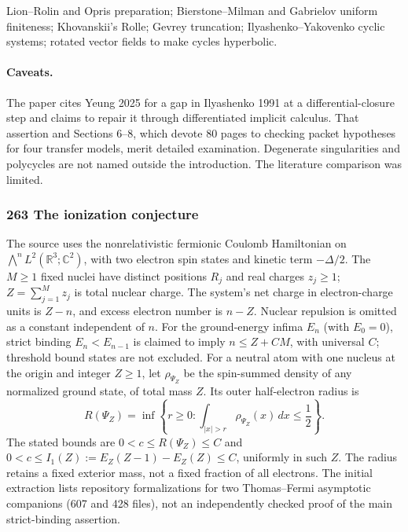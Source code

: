 \documentclass[11pt]{article}
\newcommand{\badges}[1]{\par\noindent{\small\sffamily\color{black!70}#1}\par\smallskip}
\newcommand{\badgesep}{\textbar}
\begin{document}
Lion--Rolin and Opris preparation; Bierstone--Milman and Gabrielov uniform finiteness; Khovanskii's Rolle; Gevrey truncation; Ilyashenko--Yakovenko cyclic systems; rotated vector fields to make cycles hyperbolic.

\paragraph{Caveats.}

The paper cites Yeung 2025 for a gap in Ilyashenko 1991 at a differential-closure step and claims to repair it through differentiated implicit calculus. That assertion and Sections 6--8, which devote 80 pages to checking packet hypotheses for four transfer models, merit detailed examination. Degenerate singularities and polycycles are not named outside the introduction. The literature comparison was limited.

\subsubsection{\texorpdfstring{263 \textperiodcentered{} The ionization conjecture}{263 · The ionization conjecture}}\label{fam:263}
\badges{headline not formalized; companions yes \badgesep{} new}

The source uses the nonrelativistic fermionic Coulomb Hamiltonian on $\bigwedge^n L^2(\mathbb R^3;\mathbb C^2)$, with two electron spin states and kinetic term $-\Delta/2$. The $M\ge1$ fixed nuclei have distinct positions $R_j$ and real charges $z_j\ge1$; $Z=\sum_{j=1}^M z_j$ is total nuclear charge. The system's net charge in electron-charge units is $Z-n$, and excess electron number is $n-Z$. Nuclear repulsion is omitted as a constant independent of $n$. For the ground-energy infima $E_n$ (with $E_0=0$), strict binding $E_n<E_{n-1}$ is claimed to imply $n\le Z+CM$, with universal $C$; threshold bound states are not excluded. For a neutral atom with one nucleus at the origin and integer $Z\ge1$, let $\rho_{\Psi_Z}$ be the spin-summed density of any normalized ground state, of total mass $Z$. Its outer half-electron radius is
\[
 R(\Psi_Z)=\inf\left\{r\ge0:\int_{|x|>r}\rho_{\Psi_Z}(x)\,dx\le\frac12\right\}.
\]
The stated bounds are $0<c\le R(\Psi_Z)\le C$ and $0<c\le I_1(Z):=E_Z(Z-1)-E_Z(Z)\le C$, uniformly in such $Z$. The radius retains a fixed exterior mass, not a fixed fraction of all electrons. The initial extraction lists repository formalizations for two Thomas--Fermi asymptotic companions (607 and 428 files), not an independently checked proof of the main strict-binding assertion.
\end{document}
